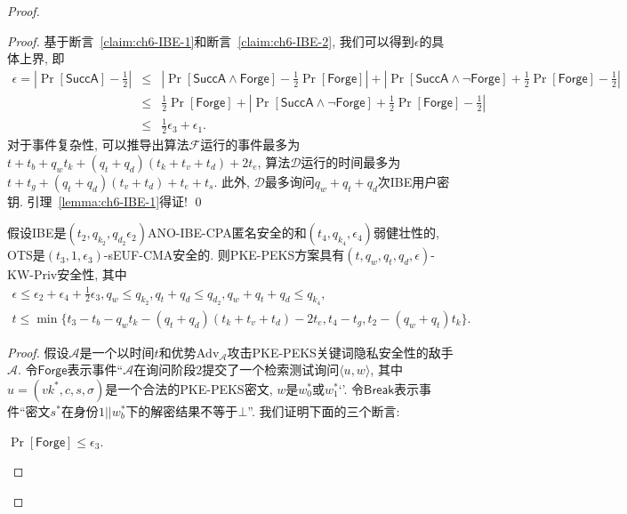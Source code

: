 \begin{proof}
\begin{proof}
基于断言~\ref{claim:ch6-IBE-1}和断言~\ref{claim:ch6-IBE-2}, 我们可以得到$\epsilon$的具体上界, 即
\[
\begin{array}{lll}
	\epsilon = |\Pr[\mathsf{SuccA}] - \frac{1}{2}| & \leq & |\Pr[\mathsf{SuccA} \wedge \mathsf{Forge}] - \frac{1}{2}\Pr[\mathsf{Forge}]| + 
	       |\Pr[\mathsf{SuccA} \wedge \neg\mathsf{Forge}] + \frac{1}{2}\Pr[\mathsf{Forge}] - \frac{1}{2}|\\ 
	&\leq&  \frac{1}{2}\Pr[\mathsf{Forge}] + |\Pr[\mathsf{SuccA} \wedge \neg\mathsf{Forge}] + \frac{1}{2} \Pr[\mathsf{Forge}] - \frac{1}{2}| \\
& \leq & \frac{1}{2}\epsilon_3 + \epsilon_1. 
\end{array}
\]
对于事件复杂性, 可以推导出算法$\mathcal{F}$运行的事件最多为$t + t_b + q_wt_k + (q_t+q_d)(t_k+t_v+t_d) + 2t_e$, 算法$\mathcal{D}$运行的时间最多为$t + t_g + (q_t+q_d)(t_v+t_d) + t_e + t_s$. 
此外, $\mathcal{D}$最多询问$q_w + q_t + q_d$次IBE用户密钥. 引理~\ref{lemma:ch6-IBE-1}得证! \qed 
\end{proof}


\begin{lemma}\label{lemma:ch6-IBE-2}
假设IBE是$(t_2, q_{k_2}, q_{d_2} \epsilon_2)$ANO-IBE-CPA匿名安全的和$(t_4, q_{k_4}, \epsilon_4)$弱健壮性的, OTS是$(t_3, 1, \epsilon_3)$-sEUF-CMA安全的. 则PKE-PEKS方案具有$(t, q_w, q_t, q_d, \epsilon)$-KW-Priv安全性, 其中
\[ 
\begin{array}{l}
	\epsilon \leq \epsilon_2 + \epsilon_4 + \frac{1}{2}\epsilon_3, q_w \leq q_{k_2}, q_t+q_d \leq q_{d_2}, q_w+q_t+q_d \leq q_{k_4}, \\
	t \leq \min\{t_3 - t_b - q_wt_k - (q_t+q_d)(t_k+t_v+t_d) - 2t_e, t_4 - t_g, t_2 - (q_w+q_t)t_k\}. 
\end{array}
\]
\end{lemma}

\begin{proof}
假设$\mathcal{A}$是一个以时间$t$和优势$\text{Adv}_\mathcal{A}$攻击PKE-PEKS关键词隐私安全性的敌手$\mathcal{A}$. 令$\mathsf{Forge}$表示事件``$\mathcal{A}$在询问阶段2提交了一个检索测试询问$\langle u, w \rangle$, 其中$u = (vk^*, c, s, \sigma)$是一个合法的PKE-PEKS密文, $w$是$w_0^*$或$w_1^*$‘’. 令$\mathsf{Break}$表示事件``密文$s^*$在身份$1||w_{b}^*$下的解密结果不等于$\bot$''.
我们证明下面的三个断言: 
\begin{claim}\label{claim:ch6-2-IBE-1}
	$\Pr[\mathsf{Forge}] \leq \epsilon_3$. 
\end{claim}


\end{proof}
\end{proof}
